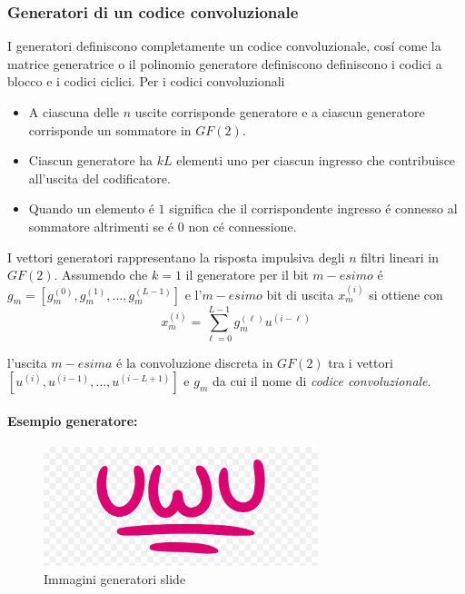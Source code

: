         \subsubsection{Generatori di un codice convoluzionale}
            I generatori definiscono completamente un codice convoluzionale, cosí come la matrice generatrice o il polinomio generatore definiscono
            definiscono i codici a blocco e i codici ciclici. Per i codici convoluzionali 
            \begin{itemize}
                \item {
                    A ciascuna delle $n$ uscite corrisponde generatore e a ciascun generatore corrisponde un sommatore in $GF(2)$.
                }
                \item {
                    Ciascun generatore ha $kL$ elementi uno per ciascun ingresso che contribuisce all'uscita del codificatore.
                }
                \item {
                    Quando un elemento é $1$ significa che il corrispondente ingresso é connesso al sommatore altrimenti se é $0$
                    non cé connessione.
                }
            \end{itemize}
            I vettori generatori rappresentano la risposta impulsiva degli $n$ filtri lineari in $GF(2)$. Assumendo che $k=1$ il 
            generatore per il bit $m-esimo$ é $g_m = [g^{(0)}_m,g^{(1)}_m,\dots,g^{(L-1)}_m]$ e l'$m-esimo$ bit di uscita $x^{(i)}_m$ 
            si ottiene con 
            \[
                x_m^{(i)} = \sum_{\ell = 0}^{L-1} g_m^{(\ell)}u^{(i-\ell)}  
            \]
            \begin{sloppypar}
                l'uscita $m-esima$ é la convoluzione discreta in $GF(2)$ tra i vettori ${[u^{(i)},u^{(i-1)},\dots,u^{(i-L+1)}]}$ e 
                $g_m$ da cui il nome di \emph{codice convoluzionale}.
            \end{sloppypar}
            \paragraph{Esempio generatore:}
            \begin{figure}[H]
                \centering
                \includegraphics[width = 8cm]{media/uwu.png}
                \caption{Immagini generatori slide}
            \end{figure}

